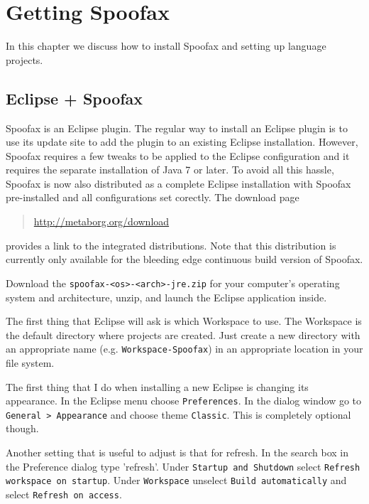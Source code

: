 \chapter{Getting Spoofax}

In this chapter we discuss how to install Spoofax and setting up language
projects.

\section{Eclipse + Spoofax}

Spoofax is an Eclipse plugin. The regular way to install an Eclipse
plugin is to use its update site to add the plugin to an existing Eclipse
installation. However, Spoofax requires a few tweaks to be applied to the
Eclipse configuration and it requires the separate installation of Java 7 or
later. To avoid all this hassle, Spoofax is now also distributed as a
complete Eclipse installation with Spoofax pre-installed and all configurations
set corectly. The download page

\begin{quote}
  \url{http://metaborg.org/download}
\end{quote}

\noindent
provides a link to the integrated distributions. Note that this distribution is
currently only available for the bleeding edge continuous build version of
Spoofax. 

Download the \texttt{spoofax-<os>-<arch>-jre.zip} for your computer's operating
 system and architecture, unzip, and launch the Eclipse application inside.
 
The first thing that Eclipse will ask is which Workspace to use. The Workspace
is the default directory where projects are created. Just create a new directory
with an appropriate name (e.g. \texttt{Workspace-Spoofax}) in an appropriate
location in your file system.

The first thing that I do when installing a new Eclipse is changing its
appearance. In the Eclipse menu choose \texttt{Preferences}. In the dialog
window go to \texttt{General > Appearance} and choose theme \texttt{Classic}. 
This is completely optional though.

Another setting that is useful to adjust is that for refresh. In the search 
box in the Preference dialog type 'refresh'. Under \texttt{Startup and Shutdown} 
select \texttt{Refresh workspace on startup}. Under \texttt{Workspace} unselect
\texttt{Build automatically} and select \texttt{Refresh on access}.

